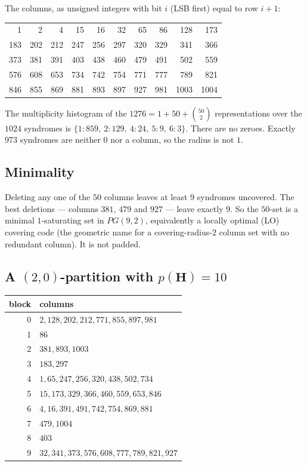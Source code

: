 \documentclass[11pt,a4paper]{article}
\newcommand{\HH}{\boldsymbol{H}}
\begin{document}
The columns, as unsigned integers with bit $i$ (LSB first) equal to
row $i+1$:
\begin{center}
\small
\begin{tabular}{@{}*{10}{r}@{}}
  1 & 2 & 4 & 15 & 16 & 32 & 65 & 86 & 128 & 173 \\
183 & 202 & 212 & 247 & 256 & 297 & 320 & 329 & 341 & 366 \\
373 & 381 & 391 & 403 & 438 & 460 & 479 & 491 & 502 & 559 \\
576 & 608 & 653 & 734 & 742 & 754 & 771 & 777 & 789 & 821 \\
846 & 855 & 869 & 881 & 893 & 897 & 927 & 981 & 1003 & 1004 \\
\end{tabular}
\end{center}

The multiplicity histogram of the $1276=1+50+\binom{50}{2}$ representations
over the $1024$ syndromes is $\{1{:}859,\ 2{:}129,\ 4{:}24,\ 5{:}9,\ 6{:}3\}$.
There are no zeroes. Exactly $973$ syndromes are neither $0$ nor a column,
so the radius is not $1$.

\subsection{Minimality}

Deleting any one of the $50$ columns leaves at least $9$ syndromes
uncovered. The best deletions --- columns $381$, $479$ and $927$ --- leave
exactly $9$. So the $50$-set is a minimal $1$-saturating set in $PG(9,2)$,
equivalently a locally optimal (LO) covering code (the geometric name for
a covering-radius-$2$ column set with no redundant column). It is not
padded.

\subsection{A $(2,0)$-partition with $p(\HH)=10$}

\begin{center}
\renewcommand{\arraystretch}{1.15}
\begin{tabular}{@{}rl@{}}
\toprule
block & columns \\
\midrule
0 & $2,128,202,212,771,855,897,981$ \\
1 & $86$ \\
2 & $381,893,1003$ \\
3 & $183,297$ \\
4 & $1,65,247,256,320,438,502,734$ \\
5 & $15,173,329,366,460,559,653,846$ \\
6 & $4,16,391,491,742,754,869,881$ \\
7 & $479,1004$ \\
8 & $403$ \\
9 & $32,341,373,576,608,777,789,821,927$ \\
\bottomrule
\end{tabular}
\end{center}
\end{document}
